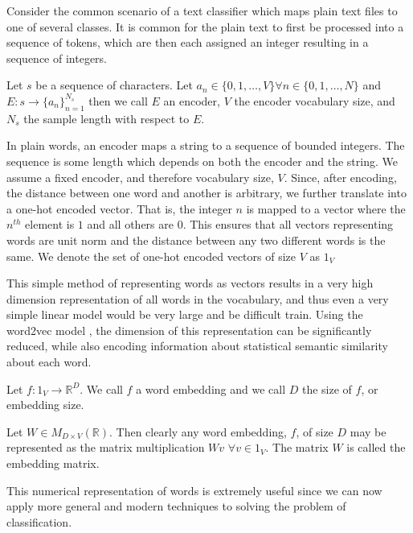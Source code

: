Consider the common scenario of a text classifier which maps plain text files to one of several classes.  It is common for the plain text to first be processed into a sequence of tokens, which are then each assigned an integer resulting in a sequence of integers.

\begin{definition}
Let $s$ be a sequence of characters.  Let $a_n \in \{0,1,\dots,V\} \forall n \in \{0,1,\dots,N\}$ and $E:s\rightarrow \{a_n\}_{n=1}^{N_s}$ then we call $E$ an encoder, $V$ the encoder vocabulary size, and $N_s$ the sample length with respect to $E$.
\end{definition}

In plain words, an encoder maps a string to a sequence of bounded integers.  The sequence is some length which depends on both the encoder and the string.  We assume a fixed encoder, and therefore vocabulary size, $V$.  Since, after encoding, the distance between one word and another is arbitrary, we further translate into a one-hot encoded vector.  That is, the integer $n$ is mapped to a vector where the $n^{th}$ element is $1$ and all others are $0$.  This ensures that all vectors representing words are unit norm and the distance between any two different words is the same.  We denote the set of one-hot encoded vectors of size $V$ as $1_V$

This simple method of representing words as vectors results in a very high dimension representation of all words in the vocabulary, and thus even a very simple linear model would be very large and be difficult train.  Using the word2vec model \cite{tm13}, the dimension of this representation can be significantly reduced, while also encoding information about statistical semantic similarity about each word.

\begin{definition}
Let $f: 1_V \rightarrow \mathbb{R}^D$.  We call $f$ a word embedding and we call $D$ the size of $f$, or embedding size.
\end{definition}

\noindent
Let $W \in M_{D\times V}(\mathbb{R})$.  Then clearly any word embedding, $f$, of size $D$ may be represented as the matrix multiplication $Wv$ $\forall v \in 1_V$.  The matrix $W$ is called the embedding matrix.

This numerical representation of words is extremely useful since we can now apply more general and modern techniques to solving the problem of classification.

